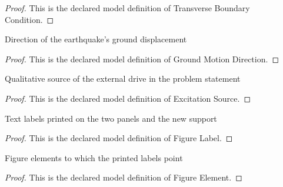 \begin{proof}
  This is the declared model definition of Transverse Boundary Condition.
\end{proof}
\begin{definition}
  \label{def:physics:phyx-mini-0210:phyxminiproblems-problemphyxmini0210-groundmotiondirection}
  Direction of the earthquake's ground displacement
\end{definition}
\begin{proof}
  This is the declared model definition of Ground Motion Direction.
\end{proof}
\begin{definition}
  \label{def:physics:phyx-mini-0210:phyxminiproblems-problemphyxmini0210-excitationsource}
  Qualitative source of the external drive in the problem statement
\end{definition}
\begin{proof}
  This is the declared model definition of Excitation Source.
\end{proof}
\begin{definition}
  \label{def:physics:phyx-mini-0210:phyxminiproblems-problemphyxmini0210-figurelabel}
  Text labels printed on the two panels and the new support
\end{definition}
\begin{proof}
  This is the declared model definition of Figure Label.
\end{proof}
\begin{definition}
  \label{def:physics:phyx-mini-0210:phyxminiproblems-problemphyxmini0210-figureelement}
  Figure elements to which the printed labels point
\end{definition}
\begin{proof}
  This is the declared model definition of Figure Element.
\end{proof}
